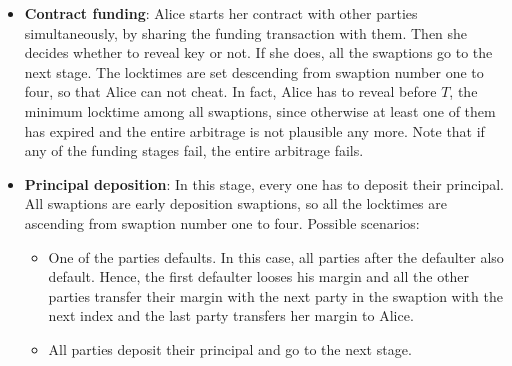 \begin{itemize}
    \item \textbf{Contract funding}: Alice starts her contract with other parties simultaneously, by sharing the funding transaction with them. Then she decides whether to reveal \Aone key or not. If she does, all the swaptions go to the next stage. The locktimes are set descending from swaption number one to four, so that Alice can not cheat. In fact, Alice has to reveal \Aone before $T$, the minimum locktime among all swaptions, since otherwise at least one of them has expired and the entire arbitrage is not plausible any more. Note that if any of the funding stages fail, the entire arbitrage fails.
    
    \item \textbf{Principal deposition}: In this stage, every one has to deposit their principal. All swaptions are early deposition swaptions, so all the locktimes are ascending from swaption number one to four. Possible scenarios: 
    \begin{itemize}
        \item One of the parties defaults. In this case, all parties after the defaulter also default. Hence, the first defaulter looses his margin and all the other parties transfer their margin with the next party in the swaption with the next index and the last party transfers her margin to Alice.
        \item All parties deposit their principal and go to the next stage.
        
    \end{itemize}
    
    
    

\end{itemize}
